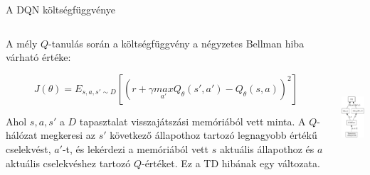 \documentclass[english, aspectratio=169]{beamer}
\begin{document}
\begin{frame}{A DQN költségfüggvénye}
\begin{columns}
\begin{column}{.75\textwidth}
A mély $Q$-tanulás során a költségfüggvény a négyzetes Bellman hiba várható értéke:
\begin{block}{}
\[
J(\theta) = E_{s,a,s' \sim D} \left[ \left( r + \gamma \underset{a'}{max} Q_\theta(s',a') - Q_\theta(s,a) \right)^2 \right]
\]
\end{block}	
Ahol $s,a,s'$ a $D$ tapasztalat visszajátszási memóriából vett minta. A $Q$-hálózat megkeresi az $s'$ következő állapothoz tartozó legnagyobb értékű cselekvést, $a'$-t, és lekérdezi a memóriából vett $s$ aktuális állapothoz és $a$ aktuális cselekvéshez tartozó $Q$-értéket. Ez a TD hibának egy változata.  
\end{column}
\begin{column}{.25\textwidth}
\begin{center}
\includegraphics[height=6cm, keepaspectratio]{graphs/dql_1.png}
\end{center}
\end{column}
\end{columns}
\end{frame}
\end{document}
